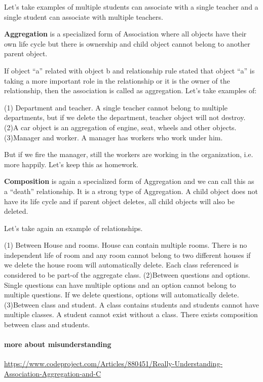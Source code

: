 \documentclass{book}
\begin{document}
Let’s take examples of multiple students can associate with a single teacher and a single student can associate with multiple teachers.

\textbf{Aggregation} is a specialized form of Association where all objects have their own life cycle but there is ownership and child object cannot belong to another parent object.

If object ``a'' related with object b and relationship rule stated that object ``a'' is taking a more important role in the relationship or it is the owner of the relationship, 
then the association is called as aggregation. Let’s take examples of:

(1)    Department and teacher. A single teacher cannot belong to multiple departments, but if we delete the department, teacher object will not destroy.
(2)A car object is an aggregation of engine, seat, wheels and other objects.
(3)Manager and worker. A manager has workers who work under him.

But if we fire the manager, still the workers are working in the organization, i.e. more happily. Let's keep this as homework. 

\textbf{Composition} is again a specialized form of Aggregation and we can call this as a “death” relationship. It is a strong type of Aggregation. 
A child object does not have its life cycle and if parent object deletes, all child objects will also be deleted.

Let’s take again an example of relationships.

(1)  Between House and rooms. House can contain multiple rooms. 
There is no independent life of room and any room cannot belong to two different houses if we delete the house room will automatically delete. 
Each class referenced is considered to be part-of the aggregate class. 
(2)Between questions and options. 
    Single questions can have multiple options and an option cannot belong to multiple questions. If we delete questions, options will automatically delete.
(3)Between class and student. 
    A class contains students and students cannot have multiple classes. A student cannot exist without a class. There exists composition between class and students.

\paragraph{more about misunderstanding}

\url{https://www.codeproject.com/Articles/880451/Really-Understanding-Association-Aggregation-and-C}
\end{document}
